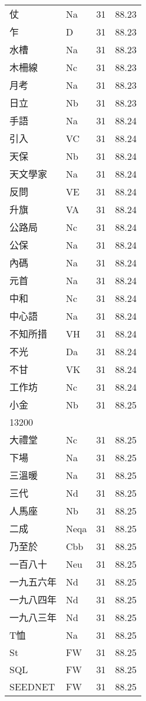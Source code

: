 \documentclass[twocolumn]{book}
\begin{document}
\begin{supertabular}{llrr}
仗 & Na & 31 &  88.23\\
乍 & D & 31 &  88.23\\
水槽 & Na & 31 &  88.23\\
木柵線 & Nc & 31 &  88.23\\
月考 & Na & 31 &  88.23\\
日立 & Nb & 31 &  88.23\\
手語 & Na & 31 &  88.24\\
引入 & VC & 31 &  88.24\\
天保 & Nb & 31 &  88.24\\
天文學家 & Na & 31 &  88.24\\
反問 & VE & 31 &  88.24\\
升旗 & VA & 31 &  88.24\\
公路局 & Nc & 31 &  88.24\\
公保 & Na & 31 &  88.24\\
內碼 & Na & 31 &  88.24\\
元首 & Na & 31 &  88.24\\
中和 & Nc & 31 &  88.24\\
中心語 & Na & 31 &  88.24\\
不知所措 & VH & 31 &  88.24\\
不光 & Da & 31 &  88.24\\
不甘 & VK & 31 &  88.24\\
工作坊 & Nc & 31 &  88.24\\
小金 & Nb & 31 &  88.25\\
13200\\
大禮堂 & Nc & 31 &  88.25\\
下場 & Na & 31 &  88.25\\
三溫暖 & Na & 31 &  88.25\\
三代 & Nd & 31 &  88.25\\
人馬座 & Nb & 31 &  88.25\\
二成 & Neqa & 31 &  88.25\\
乃至於 & Cbb & 31 &  88.25\\
一百八十 & Neu & 31 &  88.25\\
一九五六年 & Nd & 31 &  88.25\\
一九八四年 & Nd & 31 &  88.25\\
一九八三年 & Nd & 31 &  88.25\\
T恤 & Na & 31 &  88.25\\
St & FW & 31 &  88.25\\
SQL & FW & 31 &  88.25\\
SEEDNET & FW & 31 &  88.25\\

\end{supertabular}
\end{document}
